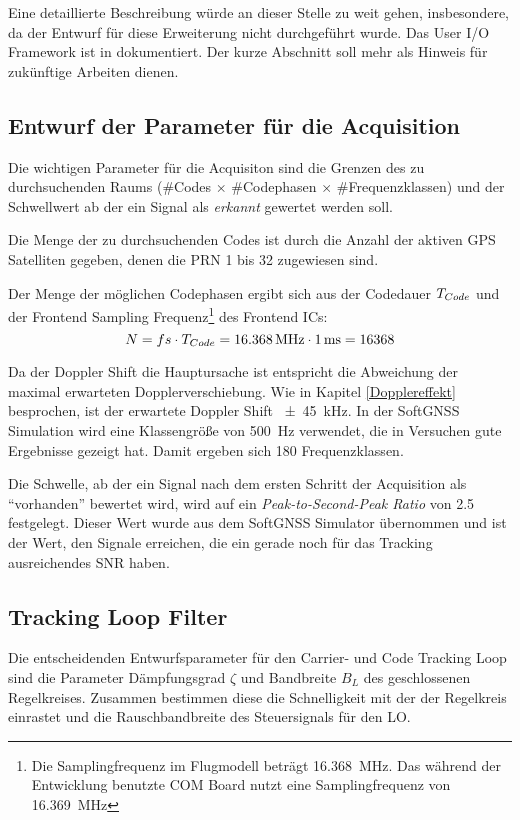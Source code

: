 Eine detaillierte Beschreibung würde an dieser Stelle zu weit gehen, insbesondere, da der Entwurf für diese Erweiterung nicht durchgeführt wurde. Das User I/O Framework ist in \cite{uioHowto} dokumentiert. Der kurze Abschnitt soll mehr als Hinweis für zukünftige Arbeiten dienen.


\subsection{Entwurf der Parameter für die Acquisition}
Die wichtigen Parameter für die Acquisiton sind die Grenzen des zu durchsuchenden Raums (\#Codes $\times$ \#Codephasen $\times$ \#Frequenzklassen) und der Schwellwert ab der ein Signal als \emph{erkannt} gewertet werden soll.

Die Menge der zu durchsuchenden Codes ist durch die Anzahl der aktiven GPS Satelliten gegeben, denen die PRN 1 bis 32 zugewiesen sind. 

Der Menge der möglichen Codephasen ergibt sich aus der Codedauer ${T}_{Code}$ und der Frontend Sampling Frequenz\footnote{Die Samplingfrequenz im Flugmodell beträgt \SI{16.368}{\mega\hertz}. Das während der Entwicklung benutzte COM Board nutzt eine Samplingfrequenz von  \SI{16.369}{\mega\hertz}} des Frontend ICs:  
\begin{equation}
    N=fs\cdot {T}_{Code}=\SI{16.368}{\mega\hertz}\cdot \SI{1}{\milli\second} = 16368
\end{equation} 

Da der Doppler Shift die Hauptursache ist entspricht die Abweichung der maximal erwarteten Dopplerverschiebung. Wie in Kapitel \ref{Dopplereffekt} besprochen, ist der erwartete Doppler Shift \SI{\pm45}{\kilo\hertz}. In der SoftGNSS Simulation wird eine Klassengröße von \SI{500}{\Hz} verwendet, die in Versuchen gute Ergebnisse gezeigt hat. Damit ergeben sich 180 Frequenzklassen.

Die Schwelle, ab der ein Signal nach dem ersten Schritt der Acquisition als \enquote{vorhanden} bewertet wird, wird auf ein \emph{Peak-to-Second-Peak Ratio} von \num{2.5} festgelegt. Dieser Wert wurde aus dem SoftGNSS Simulator übernommen und ist der Wert, den Signale erreichen, die ein gerade noch für das Tracking ausreichendes SNR haben.

\subsection{Tracking Loop Filter}
Die entscheidenden Entwurfsparameter für den Carrier- und Code Tracking Loop sind die Parameter Dämpfungsgrad $\zeta$ und Bandbreite $B_L$ des geschlossenen Regelkreises. Zusammen bestimmen diese die Schnelligkeit mit der der Regelkreis einrastet und die Rauschbandbreite des Steuersignals für den LO. 

